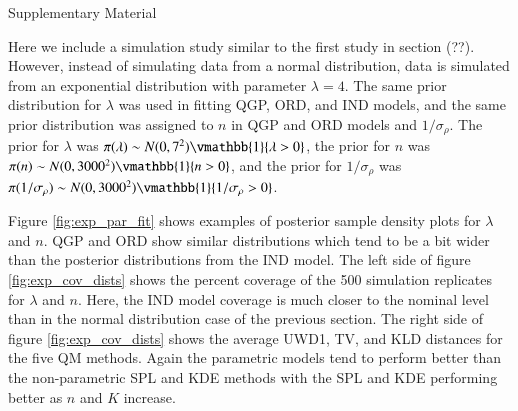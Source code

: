 \documentclass[preprint,12pt,authoryear]{elsarticle}
\begin{document}
% 



\Huge
\begin{center}
  Supplementary Material
\end{center}
\normalsize





Here we include a simulation study similar to the first study in section (??).
However, instead of simulating data from a normal distribution, data is 
simulated 
from an exponential distribution with parameter $\lambda = 4$. The same prior 
distribution for $\lambda$ was used in fitting QGP, ORD, and IND models, and the 
same prior distribution was assigned to $n$ in QGP and ORD models and 
$1/\sigma_{\rho}$. The prior for $\lambda$ was 
$\pi(\lambda) \sim N(0, 7^2)\vmathbb{1}\{\lambda > 0\}$, the prior for $n$ was
$\pi(n) \sim N(0, 3000^2)\vmathbb{1}\{n > 0\}$, and the prior for
$1/\sigma_{\rho}$ was
$\pi(1/\sigma_{\rho}) \sim N(0, 3000^2)\vmathbb{1}\{1/\sigma_{\rho} > 0\}$.

Figure \ref{fig:exp_par_fit} shows examples of posterior sample density plots 
for $\lambda$ and $n$. QGP and ORD show similar distributions which tend to be 
a bit wider than the posterior distributions from the IND model. The left side 
of figure \ref{fig:exp_cov_dists} shows the percent coverage of the 500 
simulation replicates for $\lambda$ and $n$. Here, the IND model coverage is 
much closer to the nominal level than in the normal distribution case of the 
previous section. The right side of figure \ref{fig:exp_cov_dists} shows the 
average UWD1, TV, and KLD distances for the five QM methods. Again the 
parametric models tend to perform better than the non-parametric SPL and KDE 
methods with the SPL and KDE performing better as $n$ and $K$ increase.
\end{document}
